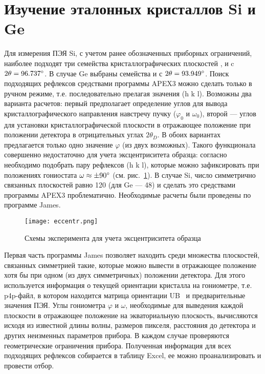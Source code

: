 \section{Изучение эталонных кристаллов Si и Ge}

Для измерения ПЭЯ Si, с учетом ранее обозначенных приборных ограничений, наиболее подходят три семейства кристаллографических плоскостей ,  и  c $2\theta = 96.737^\circ$.
В случае Ge выбраны семейства  и  с $2\theta = 93.949^\circ$.
Поиск подходящих рефлексов средствами программы APEX3 можно сделать только в ручном режиме, т.е. последовательно прелагая значения \hkl(h k l).
Возможны два варианта расчетов: первый предполагает определение углов для вывода кристаллографического направления навстречу пучку ($\varphi_0$ и $\omega_0$), второй --- углов для установки кристаллографической плоскости в отражающее положение при положении детектора в отрицательных углах $2\theta_D$.
В обоих вариантах предлагается только одно значение $\varphi$ (из двух возможных).
Такого функционала совершенно недостаточно для учета эксцентриситета образца: согласно~\cite{Ponomarev:1969} необходимо подобрать пару рефлексов \hkl(h k l), которые можно зафиксировать при положениях гониостата $\omega \approx \pm 90^\circ$ (см. рис.~\ref{fig:eccentr}).
В случае Si, число симметрично связанных плоскостей равно 120 (для Ge –-- 48) и сделать это средствами программы APEX3 проблематично.
Необходимые расчеты были проведены по программе James.

\begin{figure}[ht!]
    \centering
    \texttt{[image: eccentr.png]}
    \caption{Схемы эксперимента для учета эксцентриситета образца}%
    \label{fig:eccentr}
\end{figure}

Первая часть программы James позволяет находить среди множества плоскостей, связанных симметрией такие, которые можно вывести в отражающее положение хотя бы при одном (из двух симметричных) положении детектора.
Для этого используется информация о текущей ориентации кристалла на гониометре, т.е. p4p-файл, в котором находится матрица ориентации UB~\cite{Busing:1967} и предварительные значения ПЭЯ.
Углы гониометра $\varphi$ и $\omega$, необходимые для выведения каждой плоскости в отражающее положение на экваториальную плоскость, вычисляются исходя из известной длины волны, размеров пикселя, расстояния до детектора и других неизменных параметров прибора.
В каждом случае проверяются геометрические ограничения прибора.
Полученная информация для всех подходящих рефлексов собирается в таблицу Excel, ее можно проанализировать и провести отбор.

